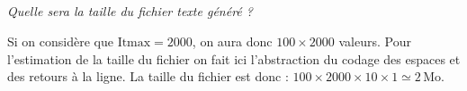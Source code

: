 \documentclass[10pt,fleqn]{article} %
\begin{document}
\begin{multicols}{2}
\subparagraph{}
\textit{Quelle sera la taille du fichier texte généré ?}
\ifprof
\begin{corrige}
Si on considère que $\text{Itmax}=2000$, on aura donc $100 \times 2000$ valeurs. Pour l'estimation de la taille du fichier on fait ici l'abstraction du codage des espaces et des retours à la ligne. 
La taille du fichier est donc : $100 \times 2000 \times 10 \times 1 \simeq 2\, \text{Mo}$.
\end{corrige}
\else
\fi
%
%

\ifprof
\else
\end{multicols}
\fi
\end{document}
